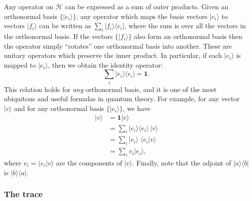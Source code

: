 \documentclass[fleqn]{article}
\begin{document}
Any operator on \(\mathcal{H}\) can be expressed as a sum of outer products. Given an orthonormal basis \(\{|e_i\rangle\}\), any operator which maps the basis vectors \(|e_i\rangle\) to vectors \(|f_i\rangle\) can be written as \(\sum_i|f_i\rangle\langle e_i|\), where the sum is over all the vectors in the orthonormal basis.
If the vectors \(\{|f_i\rangle\}\) also form an orthonormal basis then the operator simply ``rotates'' one orthonormal basis into another.
These are unitary operators which preserve the inner product.
In particular, if each \(|e_i\rangle\) is mapped to \(|e_i\rangle\), then we obtain the identity operator:
\[
  \sum_i|e_i\rangle\langle e_i|=\mathbf{1}.
\]
This relation holds for \emph{any} orthonormal basis, and it is one of the most ubiquitous and useful formulas in quantum theory.
For example, for any vector \(|v\rangle\) and for any orthonormal basis \(\{|e_i\rangle\}\), we have
\[
  \begin{aligned}
    |v\rangle
    &= \mathbf{1}|v\rangle
  \\&= \sum_i |e_i\rangle\langle e_i|\;|v\rangle
  \\&= \sum_i |e_i\rangle\;\langle e_i|v\rangle
  \\&= \sum_i v_i|e_i\rangle,
  \end{aligned}
\]
where \(v_i=\langle e_i|v\rangle\) are the components of \(|v\rangle\).
Finally, note that the adjoint of \(|a\rangle\langle b|\) is \(|b\rangle\langle a|\).

\hypertarget{the-trace}{%
\subsubsection{The trace}\label{the-trace}}
\end{document}
